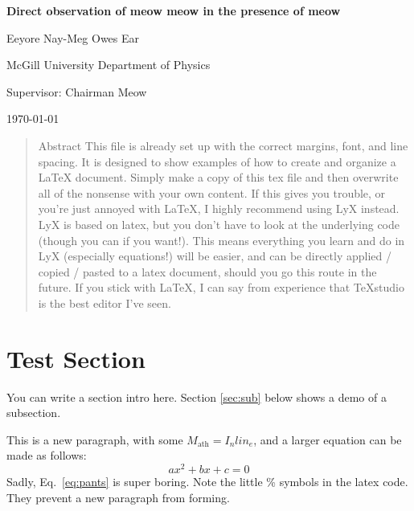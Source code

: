\documentclass[12pt]{article}
\begin{document}
	
\begin{titlepage}
	\begin{center}
		
		\vspace*{1cm}
		
		\Huge
		\textbf{Direct observation of meow meow in the presence of meow}
		\large
		\vspace{1.5cm}
		
		Eeyore Nay-Meg Owes Ear
		
		McGill University Department of Physics
		
		Supervisor: Chairman Meow
		
		\today
		
	\end{center}
\end{titlepage}

\begin{abstract}

Abstract This file is already set up with the correct margins, font, and line spacing. It is designed to show examples of how to create and organize a LaTeX document. Simply make a copy of this tex file and then overwrite all of the nonsense with your own content. If this gives you trouble, or you're just annoyed with LaTeX, I highly recommend using LyX instead. LyX is based on latex, but you don't have to look at the underlying code (though you can if you want!). This means everything you learn and do in LyX (especially equations!) will be easier, and can be directly applied / copied / pasted to a latex document, should you go this route in the future. If you stick with LaTeX, I can say from experience that TeXstudio is the best editor I've seen.

\end{abstract}
\tableofcontents{}


\pagebreak



\section{Test Section}\label{sec:test}

You can write a section intro here. Section \ref{sec:sub} below shows a demo of a subsection.

This is a new paragraph, with some $M_\textrm{ath}=I_n lin_e$, and a larger equation can be made as follows:
%
\begin{equation}\label{eq:pants}
ax^2 + bx + c = 0
\end{equation}
%
Sadly, Eq.~\ref{eq:pants} is super boring. Note the little \% symbols in the latex code. They prevent a new paragraph from forming.
\end{document}
